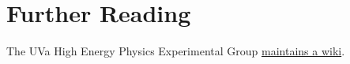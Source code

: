 \section{Further Reading}

The UVa High Energy Physics Experimental Group \href{http://faculty.virginia.edu/hep/work}{maintains a wiki}.

